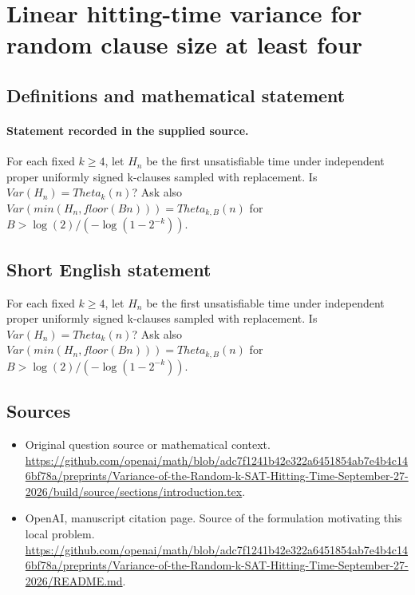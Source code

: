 \documentclass[11pt]{article}
\begin{document}
\section*{Linear hitting-time variance for random clause size at least four}\label{statement}
\subsection{Definitions and mathematical statement}
\paragraph{Statement recorded in the supplied source.}
For each fixed $k\geq 4$, let $H_n$ be the first unsatisfiable time under independent proper uniformly signed k-clauses sampled with replacement. Is $Var(H_n)=Theta_k(n)$? Ask also $Var(min(H_n,floor(Bn)))=Theta_{k,B}(n)$ for $B>\log (2)/(-\log (1-2^{-k}))$.
\subsection{Short English statement}
For each fixed $k\geq 4$, let $H_n$ be the first unsatisfiable time under independent proper uniformly signed k-clauses sampled with replacement. Is $Var(H_n)=Theta_k(n)$? Ask also $Var(min(H_n,floor(Bn)))=Theta_{k,B}(n)$ for $B>\log (2)/(-\log (1-2^{-k}))$.
\subsection{Sources}
\begin{itemize}
\item[S1] Original question source or mathematical context.
\url{https://github.com/openai/math/blob/adc7f1241b42e322a6451854ab7e4b4c146bf78a/preprints/Variance-of-the-Random-k-SAT-Hitting-Time-September-27-2026/build/source/sections/introduction.tex}.
\item[S2] OpenAI, manuscript citation page. Source of the formulation motivating this local problem.
\url{https://github.com/openai/math/blob/adc7f1241b42e322a6451854ab7e4b4c146bf78a/preprints/Variance-of-the-Random-k-SAT-Hitting-Time-September-27-2026/README.md}.
\end{itemize}
\end{document}
